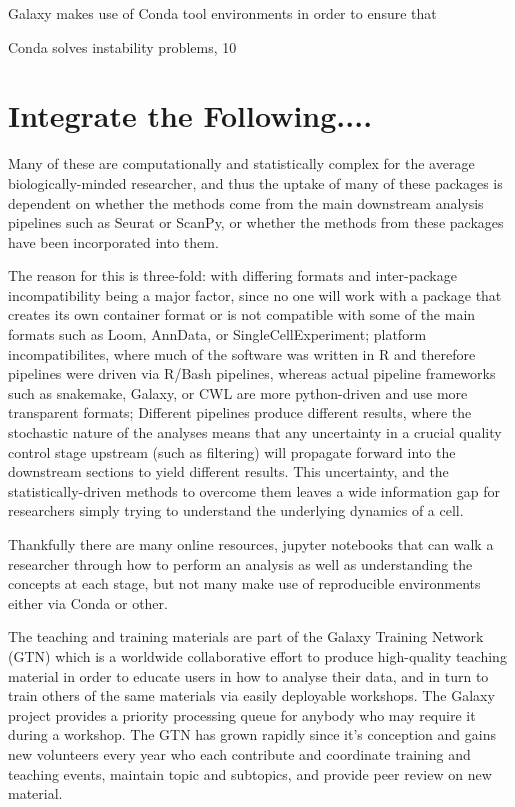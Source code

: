 \documentclass[a4paper,num-refs]{oup-contemporary}
\begin{document}
Galaxy makes use of Conda tool environments in order to ensure that 


Conda solves instability problems, 10


\section{Integrate the Following....}
Many of these are computationally and statistically complex for the average biologically-minded researcher, and thus the uptake of many of these packages is dependent on whether the methods come from the main downstream analysis pipelines such as Seurat or ScanPy, or whether the methods from these packages have been incorporated into them.

The reason for this is three-fold: with differing formats and inter-package incompatibility being a major factor, since no one will work with a package that creates its own container format or is not compatible with some of the main formats such as Loom, AnnData, or SingleCellExperiment; platform incompatibilites, where much of the software was written in R and therefore pipelines were driven via R/Bash pipelines, whereas actual pipeline frameworks such as snakemake, Galaxy, or CWL are more python-driven and use more transparent formats; Different pipelines produce different results, where the stochastic nature of the analyses means that any uncertainty in a crucial quality control stage upstream (such as filtering) will propagate forward into the downstream sections to yield different results. This uncertainty, and the statistically-driven methods to overcome them leaves a wide information gap for researchers simply trying to understand the underlying dynamics of a cell.

Thankfully there are many online resources, jupyter notebooks that can walk a researcher through how to perform an analysis as well as understanding the concepts at each stage, but not many make use of reproducible environments either via Conda or other.

The teaching and training materials are part of the Galaxy Training Network (GTN) which is a worldwide collaborative effort to produce high-quality teaching material in order to educate users in how to analyse their data, and in turn to train others of the same materials via easily deployable workshops. The Galaxy project provides a priority processing queue for anybody who may require it during a workshop. The GTN has grown rapidly since it's conception and gains new volunteers every year who each contribute and coordinate training and teaching events, maintain topic and subtopics, and provide peer review on new material.
\end{document}
